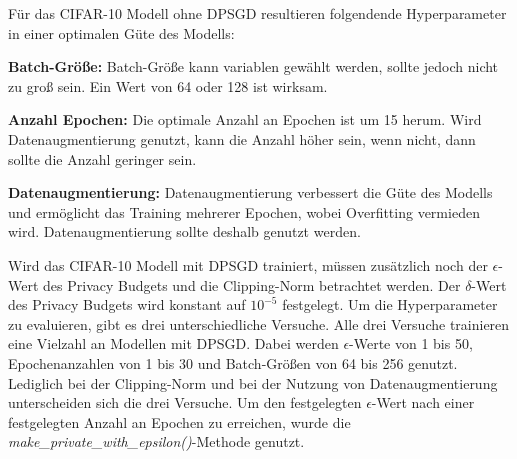 Für das CIFAR-10 Modell ohne DPSGD resultieren folgendende Hyperparameter in einer optimalen Güte des Modells:
\begin{compactitem}
    \item \textbf{Batch-Größe:} Batch-Größe kann variablen gewählt werden, sollte jedoch nicht zu groß sein. Ein Wert von 64 oder 128 ist wirksam.
    \item \textbf{Anzahl Epochen:} Die optimale Anzahl an Epochen ist um 15 herum. Wird Datenaugmentierung genutzt, kann die Anzahl höher sein, wenn nicht, dann sollte die Anzahl geringer sein.
    \item \textbf{Datenaugmentierung:} Datenaugmentierung verbessert die Güte des Modells und ermöglicht das Training mehrerer Epochen, wobei Overfitting vermieden wird. Datenaugmentierung sollte deshalb genutzt werden.
\end{compactitem}


Wird das CIFAR-10 Modell mit DPSGD trainiert, müssen zusätzlich noch der $\epsilon$-Wert des Privacy Budgets und die Clipping-Norm betrachtet werden. 
Der $\delta$-Wert des Privacy Budgets wird konstant auf $10^{-5}$ festgelegt.
Um die Hyperparameter zu evaluieren, gibt es drei unterschiedliche Versuche.
Alle drei Versuche trainieren eine Vielzahl an Modellen mit DPSGD.
Dabei werden $\epsilon$-Werte von 1 bis 50, Epochenanzahlen von 1 bis 30 und Batch-Größen von 64 bis 256 genutzt.
Lediglich bei der Clipping-Norm und bei der Nutzung von Datenaugmentierung unterscheiden sich die drei Versuche.
Um den festgelegten $\epsilon$-Wert nach einer festgelegten Anzahl an Epochen zu erreichen, wurde die \textit{\mbox{make\_private\_with\_epsilon()}}-Methode genutzt.

